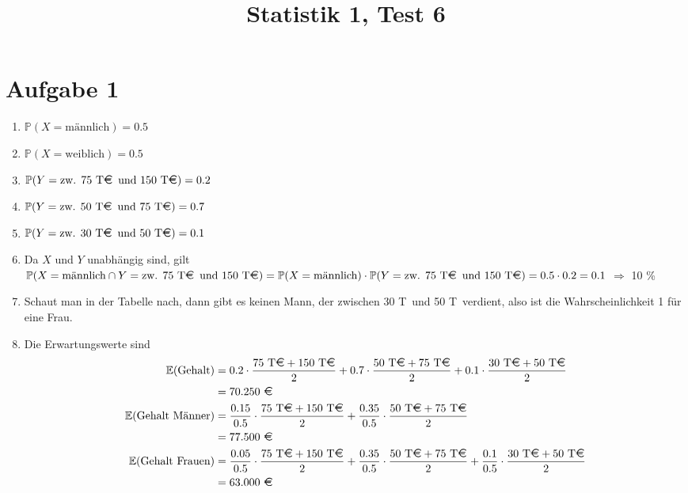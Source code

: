 \documentclass{article}
\title{\textbf{Statistik 1, Test 6}}
\date{}
\newcommand{\E}{\mathbb{E}}
\begin{document}
	\maketitle
	
	\section*{Aufgabe 1}
	\begin{enumerate}[label=(\alph*)]
		\item $\mathbb{P}(X=\text{männlich}) = 0.5$
		\item $\mathbb{P}(X=\text{weiblich}) = 0.5$
		\item $\mathbb{P}(Y=\text{zw. 75 T\EUR\, und 150 T\EUR}) = 0.2$
		\item $\mathbb{P}(Y=\text{zw. 50 T\EUR\, und 75 T\EUR}) = 0.7$
		\item $\mathbb{P}(Y=\text{zw. 30 T\EUR\, und 50 T\EUR}) = 0.1$
		\item Da $X$ und $Y$ unabhängig sind, gilt $\mathbb{P}(X=\text{männlich} \cap Y = \text{zw. 75 T\EUR\, und 150 T\EUR}) = \mathbb{P}(X=\text{männlich}) \cdot \mathbb{P}(Y = \text{zw. 75 T\EUR\, und 150 T\EUR}) = 0.5 \cdot 0.2 = 0.1$ $\Rightarrow$ 10 \%
		\item Schaut man in der Tabelle nach, dann gibt es keinen Mann, der zwischen 30 T\EUR\, und 50 T\EUR\, verdient, also ist die Wahrscheinlichkeit 1 für eine Frau.
		\item Die Erwartungswerte sind
		\begin{align}
			\E(\text{Gehalt}) &= 0.2\cdot \frac{75\text{ T\EUR} + 150\text{ T\EUR}}{2} + 0.7\cdot \frac{50\text{ T\EUR} + 75\text{ T\EUR}}{2} + 0.1\cdot \frac{30\text{ T\EUR} + 50\text{ T\EUR}}{2} \notag \\
			&= 70.250 \text{ \EUR} \notag \\
			\E(\text{Gehalt Männer}) &= \frac{0.15}{0.5}\cdot \frac{75\text{ T\EUR} + 150\text{ T\EUR}}{2} + \frac{0.35}{0.5}\cdot \frac{50\text{ T\EUR} + 75\text{ T\EUR}}{2} \notag \\
			&= 77.500 \text{ \EUR} \notag \\
			\E(\text{Gehalt Frauen}) &= \frac{0.05}{0.5}\cdot \frac{75\text{ T\EUR} + 150\text{ T\EUR}}{2} + \frac{0.35}{0.5}\cdot \frac{50\text{ T\EUR} + 75\text{ T\EUR}}{2} + \frac{0.1}{0.5}\cdot \frac{30\text{ T\EUR} + 50\text{ T\EUR}}{2} \notag \\
			&= 63.000 \text{ \EUR} \notag
		\end{align}
	\end{enumerate}
\end{document}
